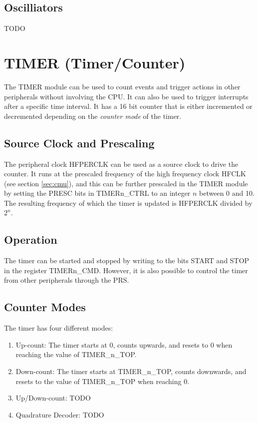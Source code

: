 
\subsection{Oscilliators}
TODO %


\section{TIMER (Timer/Counter)}
The TIMER module can be used to count events and trigger actions in other peripherals without involving the CPU. It can also be used to trigger interrupts after a specific time interval. It has a 16 bit counter that is either incremented or decremented depending on the \emph{counter mode} of the timer.

\subsection{Source Clock and Prescaling} The peripheral clock HFPERCLK can be used as a source clock to drive the counter. It runs at the prescaled frequency of the high frequency clock HFCLK (see section \ref{sec:cmu}), and this can be further prescaled in the TIMER module by setting the PRESC bits in TIMERn\_CTRL to an integer $n$ between 0 and 10. The resulting frequency of which the timer is updated is HFPERCLK divided by $2^{n}$.

\subsection{Operation}
The timer can be started and stopped by writing to the bits START and STOP in the register TIMERn\_CMD. However, it is also possible to control the timer from other peripherals through the PRS.

\subsection{Counter Modes}
The timer has four different modes:
\begin{enumerate}
	\item Up-count: The timer starts at 0, counts upwards, and resets to 0 when reaching the value of TIMER\_n\_TOP.
	\item Down-count: The timer starts at TIMER\_n\_TOP, counts downwards, and resets to the value of TIMER\_n\_TOP when reaching 0.

	\item Up/Down-count: TODO %
	\item Quadrature Decoder: TODO %
\end{enumerate}


